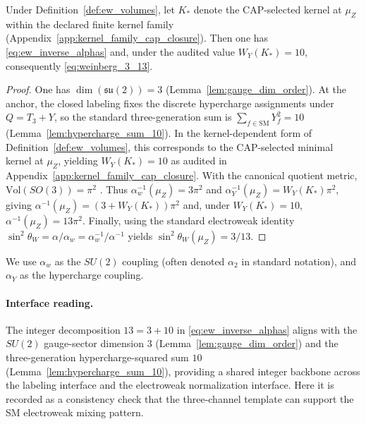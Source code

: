 \begin{theorem}\label{thm:weinberg_angle}
Under Definition~\ref{def:ew_volumes}, let $K_\ast$ denote the CAP-selected kernel at $\mu_Z$ within the declared finite kernel family (Appendix~\ref{app:kernel_family_cap_closure}).
Then one has \eqref{eq:ew_inverse_alphas} and, under the audited value $W_Y(K_\ast)=10$, consequently \eqref{eq:weinberg_3_13}.
\end{theorem}
\begin{proof}
One has $\dim(\mathfrak{su}(2))=3$ (Lemma~\ref{lem:gauge_dim_order}).
At the anchor, the closed labeling fixes the discrete hypercharge assignments under $Q=T_3+Y$, so the standard three-generation sum is $\sum_{f\in\mathrm{SM}}Y_f^2=10$ (Lemma~\ref{lem:hypercharge_sum_10}).
In the kernel-dependent form of Definition~\ref{def:ew_volumes}, this corresponds to the CAP-selected minimal kernel at $\mu_Z$, yielding $W_Y(K_\ast)=10$ as audited in Appendix~\ref{app:kernel_family_cap_closure}.
With the canonical quotient metric, $\mathrm{Vol}(SO(3))=\pi^2$ \cite{Nakahara2003}.
Thus $\alpha_w^{-1}(\mu_Z)=3\pi^2$ and $\alpha_Y^{-1}(\mu_Z)=W_Y(K_\ast)\pi^2$, giving $\alpha^{-1}(\mu_Z)=(3+W_Y(K_\ast))\pi^2$ and, under $W_Y(K_\ast)=10$, $\alpha^{-1}(\mu_Z)=13\pi^2$.
Finally, using the standard electroweak identity $\sin^2\theta_W=\alpha/\alpha_w=\alpha_w^{-1}/\alpha^{-1}$ \cite{PeskinSchroeder1995,PDGRPP2024} yields $\sin^2\theta_W(\mu_Z)=3/13$.
\end{proof}
\begin{remark}
We use $\alpha_w$ as the $SU(2)$ coupling (often denoted $\alpha_2$ in standard notation), and $\alpha_Y$ as the hypercharge coupling.
\end{remark}
\paragraph{Interface reading.}
The integer decomposition $13=3+10$ in \eqref{eq:ew_inverse_alphas} aligns with the $SU(2)$ gauge-sector dimension $3$ (Lemma~\ref{lem:gauge_dim_order}) and the three-generation hypercharge-squared sum $10$ (Lemma~\ref{lem:hypercharge_sum_10}), providing a shared integer backbone across the labeling interface and the electroweak normalization interface.
Here it is recorded as a consistency check that the three-channel template can support the SM electroweak mixing pattern.

